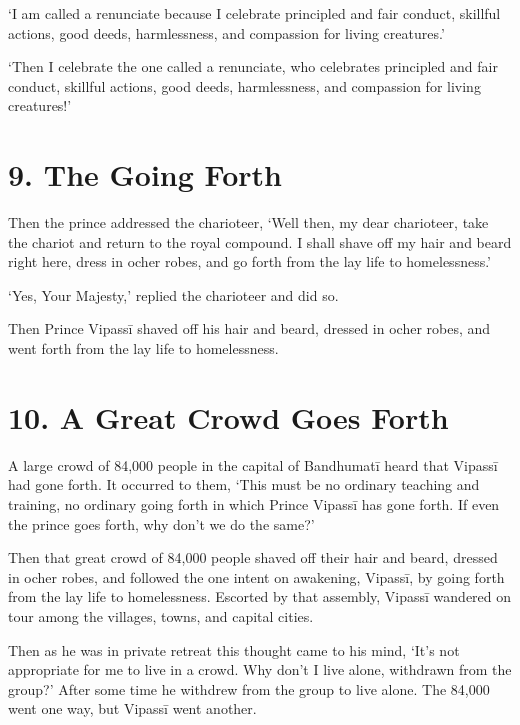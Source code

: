 \documentclass[12pt,openany]{book}%
\begin{document}
‘I am called a renunciate because I celebrate principled and fair conduct, skillful actions, good deeds, harmlessness, and compassion for living creatures.’ 

‘Then I celebrate the one called a renunciate, who celebrates principled and fair conduct, skillful actions, good deeds, harmlessness, and compassion for living creatures!’ 

\section*{9. The Going Forth }

Then the prince addressed the charioteer, ‘Well then, my dear charioteer, take the chariot and return to the royal compound. I shall shave off my hair and beard right here, dress in ocher robes, and go forth from the lay life to homelessness.’ 

‘Yes, Your Majesty,’ replied the charioteer and did so. 

Then Prince \textsanskrit{Vipassī} shaved off his hair and beard, dressed in ocher robes, and went forth from the lay life to homelessness. 

\section*{10. A Great Crowd Goes Forth }

A large crowd of 84,000 people in the capital of \textsanskrit{Bandhumatī} heard that \textsanskrit{Vipassī} had gone forth. It occurred to them, ‘This must be no ordinary teaching and training, no ordinary going forth in which Prince \textsanskrit{Vipassī} has gone forth. If even the prince goes forth, why don’t we do the same?’ 

Then that great crowd of 84,000 people shaved off their hair and beard, dressed in ocher robes, and followed the one intent on awakening, \textsanskrit{Vipassī}, by going forth from the lay life to homelessness. Escorted by that assembly, \textsanskrit{Vipassī} wandered on tour among the villages, towns, and capital cities. 

Then as he was in private retreat this thought came to his mind, ‘It’s not appropriate for me to live in a crowd. Why don’t I live alone, withdrawn from the group?’ After some time he withdrew from the group to live alone. The 84,000 went one way, but \textsanskrit{Vipassī} went another. 
\end{document}
